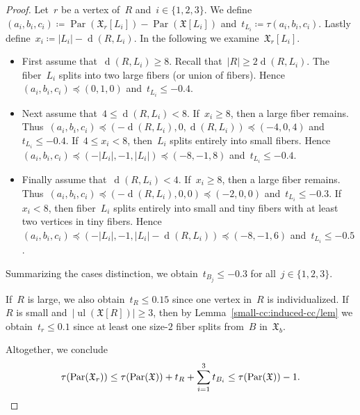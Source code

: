 \documentclass[english,a4paper]{article}
\theoremstyle{plain}
\theoremstyle{definition}
\newcommand{\abs}[1]{| #1 |}
\newcommand{\coherentConfig}{\ensuremath{\mathfrak{X}}}
\newcommand{\inducedCC}[1]{\ensuremath{\coherentConfig[#1]}}
\newcommand{\minimalDegree}[2]{\Deg(#1,#2)}
\DeclareMathOperator*{\ul}{ul}
\DeclareMathOperator{\Deg}{d}
\DeclareMathOperator{\parameters}{Par}
\begin{document}
\begin{proof}
    Let~$r$ be a vertex of~$R$ and~$i \in \{1,2,3\}$.
    We define~$(a_i,b_i,c_i) \coloneqq \parameters(\coherentConfig_r[L_i]) - \parameters(\coherentConfig[L_i])$ and~$t_{L_i} \coloneqq \tau(a_i,b_i,c_i)$.
    Lastly define~$x_i \coloneqq \abs{L_i}-\minimalDegree{R}{L_i}$.
    In the following we examine~$\coherentConfig_r[L_i]$.
    \begin{itemize}
        \item
        First assume that~$\minimalDegree{R}{L_i} \geq 8$.
        Recall that~$\abs{R} \geq 2\minimalDegree{R}{L_i}$.
        The fiber~$L_i$ splits into two large fibers (or union of fibers).
        Hence~$(a_i,b_i,c_i) \preceq (0,1,0)$ and~$t_{L_i} \leq -0.4$.

        \item
        Next assume that~$4 \leq \minimalDegree{R}{L_i} < 8$.
        If~$x_i \geq 8$, then a large fiber remains.
        Thus~$(a_i,b_i,c_i) \preceq (-\minimalDegree{R}{L_i},0,\minimalDegree{R}{L_i}) \preceq (-4,0,4)$ and~$t_{L_i} \leq -0.4$.
        If~$4 \leq x_i < 8$, then~$L_i$ splits entirely into small fibers.
        Hence~$(a_i,b_i,c_i) \preceq (-\abs{L_i},-1,\abs{L_i}) \preceq (-8,-1,8)$ and~$t_{L_i} \leq -0.4$.

        \item
        Finally assume that~$\minimalDegree{R}{L_i} < 4$.
        If~$x_i \geq 8$, then a large fiber remains.
        Thus~$(a_i,b_i,c_i) \preceq (-\minimalDegree{R}{L_i},0,0) \preceq (-2,0,0)$ and~$t_{L_i} \leq -0.3$.
        If~$x_i < 8$, then fiber~$L_i$ splits entirely into small and tiny fibers with at least two vertices in tiny fibers.
        Hence~$(a_i,b_i,c_i) \preceq (-\abs{L_i},-1,\abs{L_i} - \minimalDegree{R}{L_i}) \preceq (-8,-1,6)$ and~$t_{L_i} \leq -0.5$.
    \end{itemize}
    Summarizing the cases distinction, we obtain~$t_{B_j} \leq -0.3$ for all~$j \in \{1,2,3\}$.

    If~$R$ is large, we also obtain~$t_R\leq 0.15$ since one vertex in~$R$ is individualized.
    If~$R$ is small and~$|\ul(\inducedCC{R})| \geq 3$, then by Lemma~\ref{small-cc:induced-cc/lem} we obtain~$t_r\leq 0.1$ since at least one size-$2$ fiber splits from~$B$ in~$\coherentConfig_b$.

    Altogether, we conclude
    \[
        \tau(\parameters(\coherentConfig_r)) \leq \tau(\parameters(\coherentConfig)) + t_R + \sum_{i=1}^{3} t_{B_i} \leq \tau(\parameters(\coherentConfig)) - 1.
        \qedhere
    \]
\end{proof}
\end{document}
